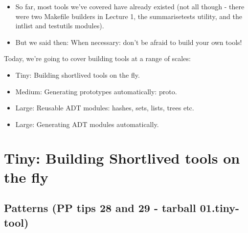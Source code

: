 \documentclass[aspectratio=169]{beamer}
\newcommand{\pitem}{\pause \item}
\begin{document}
\begin{frame}[fragile]
    \begin{itemize}
      \item
      So far, most tools we've covered have already existed (not all though -
      there were two Makefile builders in Lecture 1, the
      summarisetests utility, and the intlist and testutils modules).
    \pitem
      But we said then: \alert{When necessary: don't be afraid to build your
      own tools!}
    \end{itemize}

    \pause
    Today, we're going to cover building tools at a range of scales:

    \begin{itemize}
      \item
        Tiny: Building \alert{shortlived tools on the fly}.
      \pitem
        Medium: \alert{Generating prototypes automatically: proto}.
      \pitem
        Large: \alert{Reusable ADT modules}: hashes, sets, lists, trees etc.
      \pitem
        Large: Generating \alert{ADT modules} automatically.
    \end{itemize}
\end{frame}

\section{Tiny: Building Shortlived tools on the fly}
\subsection{Patterns (PP tips 28 and 29 - tarball 01.tiny-tool)}
\end{document}
